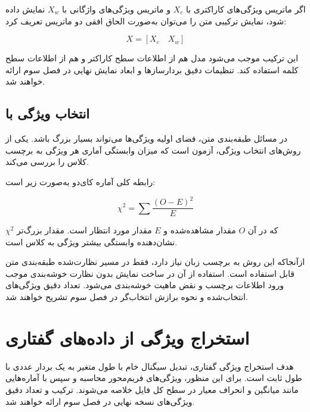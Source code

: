 اگر ماتریس ویژگی‌های کاراکتری با $X_c$ و ماتریس ویژگی‌های واژگانی با $X_w$ نمایش داده شود، نمایش ترکیبی متن را می‌توان به‌صورت الحاق افقی دو ماتریس تعریف کرد:

\begin{equation}
X=
\left[
X_c
\quad
X_w
\right]
\end{equation}

این ترکیب موجب می‌شود مدل هم از اطلاعات سطح کاراکتر و هم از اطلاعات سطح کلمه استفاده کند. تنظیمات دقیق بردارسازها و ابعاد نمایش نهایی در فصل سوم ارائه خواهند شد.


\subsection{انتخاب ویژگی با }

در مسائل طبقه‌بندی متن، فضای اولیه ویژگی‌ها می‌تواند بسیار بزرگ باشد. یکی از روش‌های انتخاب ویژگی، آزمون
است که میزان وابستگی آماری هر ویژگی به برچسب کلاس را بررسی می‌کند.

رابطه کلی آماره کای‌دو به‌صورت زیر است:

\begin{equation}
\chi^2
=
\sum
\frac{(O-E)^2}{E}
\end{equation}

که در آن $O$ مقدار مشاهده‌شده و $E$ مقدار مورد انتظار است. مقدار بزرگ‌تر
$\chi^2$
نشان‌دهنده وابستگی بیشتر ویژگی به کلاس است.

ازآنجاکه این روش به برچسب زبان نیاز دارد، فقط در مسیر نظارت‌شده طبقه‌بندی متن قابل استفاده است. استفاده از آن در ساخت نمایش بدون نظارت خوشه‌بندی موجب ورود اطلاعات برچسب و نقض ماهیت خوشه‌بندی می‌شود. تعداد دقیق ویژگی‌های انتخاب‌شده و نحوه برازش انتخاب‌گر در فصل سوم تشریح خواهند شد.


\section{استخراج ویژگی از داده‌های گفتاری}

هدف استخراج ویژگی گفتاری، تبدیل سیگنال خام با طول متغیر به یک بردار عددی با طول ثابت است. برای این منظور، ویژگی‌های فریم‌محور محاسبه و سپس با آماره‌هایی مانند میانگین و انحراف معیار در سطح کل فایل خلاصه می‌شوند. ترکیب و تعداد دقیق ویژگی‌های نسخه نهایی در فصل سوم ارائه خواهند شد.


